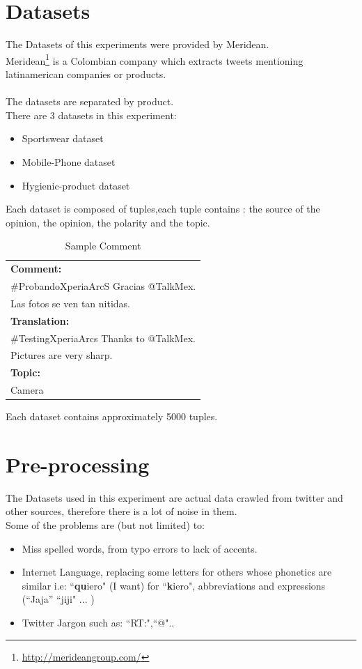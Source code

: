 \documentclass[4pt,a4paper,twocolumn]{article}
\begin{document}
\section{Datasets}
The Datasets of this experiments were provided by Meridean.\\
Meridean\footnote{\url{http://merideangroup.com/}} is a Colombian company which extracts tweets
mentioning latinamerican companies or products.\\
\\
The datasets are separated by product.\\
There are 3 datasets in this experiment:
\begin{itemize}
	\item Sportswear dataset
	\item Mobile-Phone dataset
	\item Hygienic-product dataset
\end{itemize}

Each dataset is composed of tuples,each tuple contains : the source of the opinion, the opinion, the polarity and the topic.\\

\begin{table}[h]
\centering
\begin{tabular}{| l |}
\hline
\textbf{Comment:}\\
$\#$ProbandoXperiaArcS Gracias @TalkMex.\\
Las fotos se ven tan nitidas.\\
\hline
\textbf{Translation:}\\
$\#$TestingXperiaArcs Thanks to @TalkMex.\\
Pictures are very sharp.\\
\hline
\textbf{Topic:}\\
Camera\\
\hline
\end{tabular}
\caption{Sample Comment}
\label{tab:sampleTuple}
\end{table}

Each dataset contains approximately 5000 tuples.

\section{Pre-processing}

The Datasets used in this experiment are actual data crawled from twitter and other sources, therefore there is a lot of noise in them.\\
Some of the problems are (but not limited) to:\\
\begin{itemize}
	\item Miss spelled words, from typo errors to lack of accents.
	\item Internet Language, replacing some letters for others whose phonetics are similar i.e: ``\textbf{qu}iero" (I want) for ``\textbf{k}iero", abbreviations and expressions (``Jaja'' ``jiji" ... )
	\item Twitter Jargon such as: ``RT:",``@"..
\end{itemize} 
\end{document}

